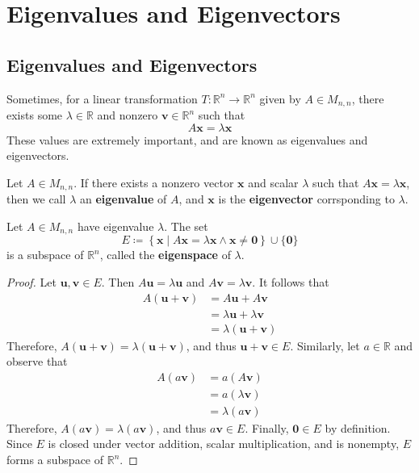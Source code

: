 \chapter{Eigenvalues and Eigenvectors}
\section{Eigenvalues and Eigenvectors}
Sometimes, for a linear transformation \(T:\mathbb{R} ^n \to \mathbb{R} ^n\) given by \(A\in M_{n,n}\), there exists some \(\lambda\in \mathbb{R}  \) and nonzero \(\mathbf{v} \in\mathbb{R} ^n\) such that 
\[
    A \mathbf{x} =\lambda  \mathbf{x} 
\]
These values are extremely important, and are known as eigenvalues and eigenvectors.
\begin{definition}
    Let \(A\in M_{n,n}\). If there exists a nonzero vector \(\mathbf{x} \) and scalar \(\lambda \) such that \(A \mathbf{x} =\lambda  \mathbf{x} \), then we call \(\lambda \) an \textbf{eigenvalue} of \(A\), and \(\mathbf{x} \) is the \textbf{eigenvector} corrsponding to \(\lambda \).
\end{definition}	
\begin{theorem}[Eigenspace]
    Let \(A\in M_{n,n}\) have eigenvalue \(\lambda \). The set
    \[
        E\coloneqq \left\{ \mathbf{x} \mid A \mathbf{x} =\lambda \mathbf{x} \land \mathbf{x} \neq \mathbf{0}  \right\} \cup \{ \mathbf{0}  \}
    \]
    is a subspace of \(\mathbb{R} ^n\), called the \textbf{eigenspace} of \(\lambda \).
\end{theorem}
\begin{proof}
    Let \(\mathbf{u} ,\mathbf{v} \in E\). Then \(A \mathbf{u} =\lambda  \mathbf{u} \) and \(A \mathbf{v} =\lambda \mathbf{v} \). It follows that 
    \begin{align*}
        A(\mathbf{u} +\mathbf{v} )&=A \mathbf{u} +A \mathbf{v} \\
        &=\lambda \mathbf{u} +\lambda \mathbf{v} \\
        &=\lambda (\mathbf{u} +\mathbf{v} )
    \end{align*}
    Therefore, \(A(\mathbf{u} +\mathbf{v} )=\lambda (\mathbf{u} +\mathbf{v} )\), and thus \(\mathbf{u} +\mathbf{v} \in E\). Similarly, let \(a\in\mathbb{R} \) and observe that
    \begin{align*}
        A(a \mathbf{v} )&=a(A \mathbf{v} )\\
        &=a(\lambda \mathbf{v} )\\
        &=\lambda (a \mathbf{v} )
    \end{align*}
    Therefore, \(A(a \mathbf{v} )=\lambda (a \mathbf{v} )\), and thus \(a \mathbf{v} \in E\). Finally, \(\mathbf{0}\in E \) by definition. Since \(E\) is closed under vector addition, scalar multiplication, and is nonempty, \(E\) forms a subspace of \(\mathbb{R} ^n\).
\end{proof}
